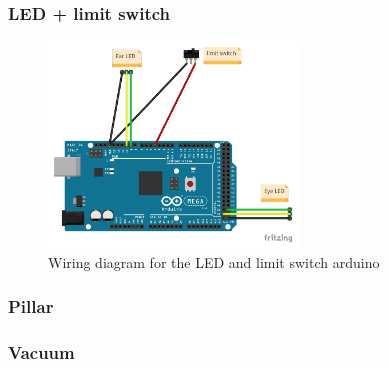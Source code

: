 \subsubsection{LED + limit switch}
\begin{figure}[h]
\centering
\includegraphics[width=250px]{figures/head_arduino_bb.pdf}
\caption{Wiring diagram for the LED and limit switch arduino}
\label{fig:head_arduino}
\end{figure}

\subsubsection{Pillar}

\subsubsection{Vacuum}

